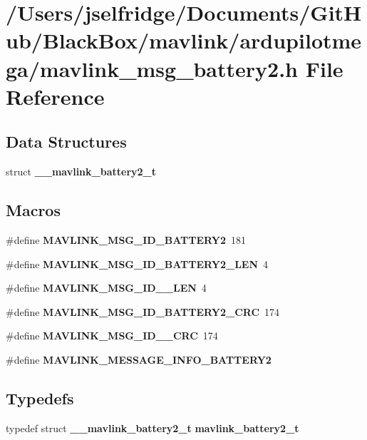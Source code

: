 \section{/\+Users/jselfridge/\+Documents/\+Git\+Hub/\+Black\+Box/mavlink/ardupilotmega/mavlink\+\_\+msg\+\_\+battery2.h File Reference}
\label{mavlink__msg__battery2_8h}
\subsection*{Data Structures}
\begin{DoxyCompactItemize}
\item 
struct \textbf{ \+\_\+\+\_\+mavlink\+\_\+battery2\+\_\+t}
\end{DoxyCompactItemize}
\subsection*{Macros}
\begin{DoxyCompactItemize}
\item 
\#define \textbf{ M\+A\+V\+L\+I\+N\+K\+\_\+\+M\+S\+G\+\_\+\+I\+D\+\_\+\+B\+A\+T\+T\+E\+R\+Y2}~181
\item 
\#define \textbf{ M\+A\+V\+L\+I\+N\+K\+\_\+\+M\+S\+G\+\_\+\+I\+D\+\_\+\+B\+A\+T\+T\+E\+R\+Y2\+\_\+\+L\+EN}~4
\item 
\#define \textbf{ M\+A\+V\+L\+I\+N\+K\+\_\+\+M\+S\+G\+\_\+\+I\+D\+\_\+\_\+\+L\+EN}~4
\item 
\#define \textbf{ M\+A\+V\+L\+I\+N\+K\+\_\+\+M\+S\+G\+\_\+\+I\+D\+\_\+\+B\+A\+T\+T\+E\+R\+Y2\+\_\+\+C\+RC}~174
\item 
\#define \textbf{ M\+A\+V\+L\+I\+N\+K\+\_\+\+M\+S\+G\+\_\+\+I\+D\+\_\+\_\+\+C\+RC}~174
\item 
\#define \textbf{ M\+A\+V\+L\+I\+N\+K\+\_\+\+M\+E\+S\+S\+A\+G\+E\+\_\+\+I\+N\+F\+O\+\_\+\+B\+A\+T\+T\+E\+R\+Y2}
\end{DoxyCompactItemize}
\subsection*{Typedefs}
\begin{DoxyCompactItemize}
\item 
typedef struct \textbf{ \+\_\+\+\_\+mavlink\+\_\+battery2\+\_\+t} \textbf{ mavlink\+\_\+battery2\+\_\+t}
\end{DoxyCompactItemize}


